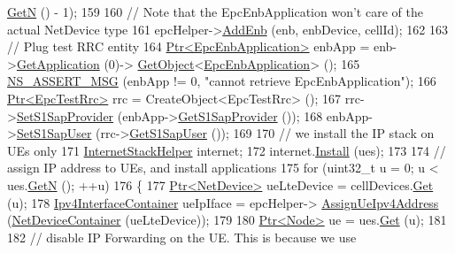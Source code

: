 \begin{DoxyCode}
      \hyperlink{classns3_1_1NetDeviceContainer_a74cafc212479bc38976bebd118e856b9}{GetN} () - 1);
159 
160       \textcolor{comment}{// Note that the EpcEnbApplication won't care of the actual NetDevice type}
161       epcHelper->\hyperlink{classns3_1_1PointToPointEpcHelper_a6636cc9c0501b719bd81ed13efd3c589}{AddEnb} (enb, enbDevice, cellId);      
162 
163       \textcolor{comment}{// Plug test RRC entity}
164       \hyperlink{classns3_1_1Ptr}{Ptr<EpcEnbApplication>} enbApp = enb->\hyperlink{classns3_1_1Node_ad0ab54d76712398c0a8e25d9ac59ea41}{GetApplication} (0)->
      \hyperlink{classns3_1_1Object_a13e18c00017096c8381eb651d5bd0783}{GetObject}<\hyperlink{classns3_1_1EpcEnbApplication}{EpcEnbApplication}> ();
165       \hyperlink{assert_8h_aff5ece9066c74e681e74999856f08539}{NS\_ASSERT\_MSG} (enbApp != 0, \textcolor{stringliteral}{"cannot retrieve EpcEnbApplication"});
166       \hyperlink{classns3_1_1Ptr}{Ptr<EpcTestRrc>} rrc = CreateObject<EpcTestRrc> ();
167       rrc->\hyperlink{classns3_1_1EpcTestRrc_a4dc91a1208c2f22d76991df2f2bd15dc}{SetS1SapProvider} (enbApp->\hyperlink{classns3_1_1EpcEnbApplication_a706b531d6ec3ab6eb37567232f5c6cd4}{GetS1SapProvider} ());
168       enbApp->\hyperlink{classns3_1_1EpcEnbApplication_aec298b6adc29bad4c52828ddf1a260d6}{SetS1SapUser} (rrc->\hyperlink{classns3_1_1EpcTestRrc_ac145e0e646ca9d170ed04d6b3b3b93c4}{GetS1SapUser} ());
169       
170       \textcolor{comment}{// we install the IP stack on UEs only}
171       \hyperlink{classns3_1_1InternetStackHelper}{InternetStackHelper} internet;
172       internet.\hyperlink{classns3_1_1InternetStackHelper_a6645b412f31283d2d9bc3d8a95cebbc0}{Install} (ues);
173 
174       \textcolor{comment}{// assign IP address to UEs, and install applications}
175       \textcolor{keywordflow}{for} (uint32\_t u = 0; u < ues.\hyperlink{classns3_1_1NodeContainer_aed647ac56d0407a7706aba02eb44b951}{GetN} (); ++u)
176         \{
177           \hyperlink{classns3_1_1Ptr}{Ptr<NetDevice>} ueLteDevice = cellDevices.\hyperlink{classns3_1_1NetDeviceContainer_a677d62594b5c9d2dea155cc5045f4d0b}{Get} (u);
178           \hyperlink{classns3_1_1Ipv4InterfaceContainer}{Ipv4InterfaceContainer} ueIpIface = epcHelper->
      \hyperlink{classns3_1_1PointToPointEpcHelper_a11102d32127163fdcc47c44623d4f0cc}{AssignUeIpv4Address} (\hyperlink{classns3_1_1NetDeviceContainer}{NetDeviceContainer} (ueLteDevice));
179 
180           \hyperlink{classns3_1_1Ptr}{Ptr<Node>} ue = ues.\hyperlink{classns3_1_1NodeContainer_a9ed96e2ecc22e0f5a3d4842eb9bf90bf}{Get} (u);
181 
182           \textcolor{comment}{// disable IP Forwarding on the UE. This is because we use}

\end{DoxyCode}
